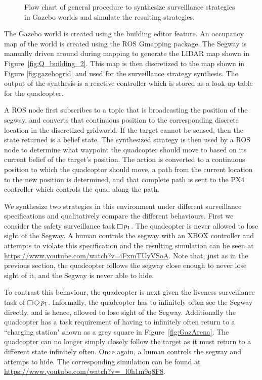 \begin{figure}[h]
  
    \caption{Flow chart of general procedure to synthesize surveillance strategies in Gazebo worlds and simulate the resulting strategies.}
    \label{fig:Flowmap}
\end{figure}


The Gazebo world is created using the building editor feature. An occupancy map of the world is created using the ROS Gmapping package. The Segway is manually driven around during mapping to generate the LIDAR map shown in Figure~\ref{fig:Q_building_2}. This map is then discretized to the map shown in Figure \ref{fig:gazebogrid} and used for the surveillance strategy synthesis. The output of the synthesis is a reactive controller which is stored as a look-up table for the quadcopter. %

 A ROS node first subscribes to a topic that is broadcasting the position of the segway, and converts that continuous position to the corresponding discrete location in the discretized gridworld. If the target cannot be sensed, then the state returned is a belief state. The synthesized strategy is then used by a ROS node to determine what waypoint the quadcopter should move to based on its current belief of the target's position. The action is converted to a continuous position to which the quadcoptor should move, a path from the current location to the new position is determined, and that complete path is sent to the PX4 controller which controls the quad along the path.

We synthesize two strategies in this environment under different surveillance specifications and qualitatively compare the different behaviours. First we consider the safety surveillance task $\LTLglobally p_1$. The quadcopter is never allowed to lose sight of the Segway. A human controls the segway with an XBOX controller and attempts to violate this specification and the resulting simulation can be seen at \url{https://www.youtube.com/watch?v=iFxmTUyVSoA}. Note that, just as in the previous section, the quadcopter follows the segway close enough to never lose sight of it, and the Segway is never able to hide. 


To contrast this behaviour, the quadcopter is next given the liveness surveillance task of $\LTLglobally \LTLfinally p_1$. Informally, the quadcopter has to infinitely often see the Segway directly, and is hence, allowed to lose sight of the Segway. Additionally the quadcopter has a task requirement of having to infinitely often return to a ``charging station" shown as a grey square in Figure~\ref{fig:GazArena}. The quadcopter can no longer simply closely follow the target as it must return to a different state infinitely often. Once again, a human controls the segway and attemps to hide. The corresponding simulation can be found at \url{https://www.youtube.com/watch?v=_l0h1m9q8F8}. 

